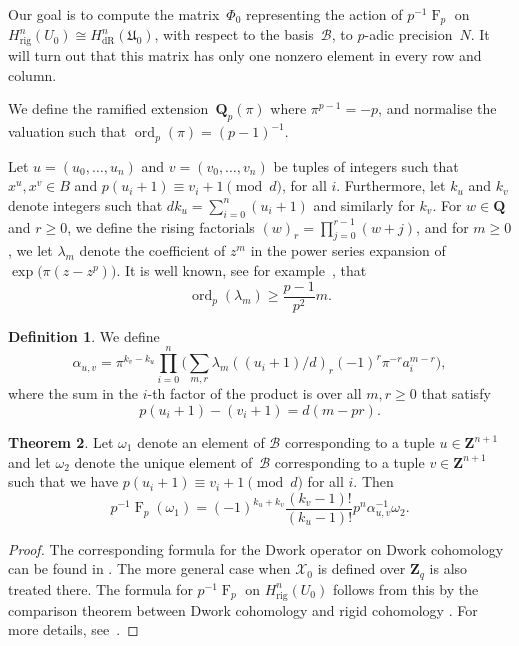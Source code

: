 \documentclass[a4paper,11pt]{article}
\numberwithin{equation}{section}
\newcommand{\ZZ}{\mathbf{Z}} %
\newcommand{\QQ}{\mathbf{Q}} %
\DeclareMathOperator{\ord}{ord}          %
\DeclareMathOperator{\Frob}{F}           %
\providecommand{\HdR}{H_{\text{dR}}}    %
\providecommand{\Hrig}{H_{\text{rig}}}  %
\providecommand{\cB}{\mathcal{B}} %
\theoremstyle{definition}
\newtheorem{thm}{Theorem}[section]
\newtheorem{defn}[thm]{Definition}
\begin{document}
Our goal is to compute 
the matrix~$\Phi_0$ representing the action of $p^{-1} \Frob_p$ on 
$\Hrig^n(U_0) \cong \HdR^n(\mathfrak{U}_0)$, with respect to the basis~$\cB$, 
to $p$-adic precision~$N$. It will turn out that this matrix has only one
nonzero element in every row and column.

We define the ramified extension~$\QQ_p(\pi)$ where $\pi^{p-1} = -p$, 
and normalise the valuation such that \mbox{$\ord_p(\pi) = (p-1)^{-1}$}.

Let $u = (u_0, \dotsc, u_n)$ and $v = (v_0, \dotsc, v_n)$ be tuples 
of integers such that $x^u, x^v \in B$ and $p (u_i+1) \equiv v_i+1 \pmod{d}$,
for all $i$. Furthermore, let $k_u$ and $k_v$ denote integers such that 
$d k_u = \sum_{i=0}^n (u_i + 1)$ and similarly for $k_v$. For $w \in \QQ$ 
and $r \geq 0$, we define the rising factorials $(w)_r = \prod_{j=0}^{r-1} (w + j)$, 
and for $m \geq 0$, we let $\lambda_m$ denote the coefficient of $z^m$ in the 
power series expansion of $\exp \bigl( \pi (z - z^p) \bigr)$. It is well known, see 
for example~\cite{Dwork1962}, that 
\begin{equation} \label{eqn:dworkbound}
\ord_p(\lambda_m) \geq \frac{p-1}{p^2} m. 
\end{equation}

\begin{defn} We define \label{defn:alpha}
\[
\alpha_{u,v} = \pi^{k_v - k_u} \prod_{i = 0}^n \biggl( \sum_{m, r} \lambda_m ((u_i + 1) / d)_r (-1)^r \pi^{-r} a_i^{m-r} \biggr),
\]
where the sum in the $i$-th factor of the product is over all $m, r \geq 0$  
that satisfy
\[
p(u_i+1)-(v_i+1)=d(m-pr).
\]
\end{defn}

\begin{thm} \label{thm:01-03-diagfrob}
Let $\omega_1$ denote an element of $\cB$ corresponding to a tuple 
$u \in \ZZ^{n+1}$ and let $\omega_2$ denote the unique element of~$\cB$ 
corresponding to a tuple $v \in \ZZ^{n+1}$ such that
we have $p (u_i + 1) \equiv v_i + 1 \pmod{d}$ for all $i$. Then
\begin{equation*}
p^{-1} \Frob_p (\omega_1) = 
    (-1)^{k_u + k_v} \frac{(k_v - 1)!}{(k_u - 1)!} p^n \alpha_{u,v}^{-1} \omega_2.
\end{equation*}
\end{thm}

\begin{proof}
The corresponding formula for the Dwork operator on Dwork cohomology can
be found in %
\citep[\S 6.1]{Lauder2004b}. The more general case when $\mathcal{X}_0$ 
is defined over $\ZZ_q$ is also treated there. The formula for 
$p^{-1} \Frob_p$ on $\Hrig^n(U_0)$ follows from this by the comparison theorem 
between Dwork cohomology and rigid cohomology \cite[Theorem 1.12]{Katz}. 
For more details, see~\cite[Theorem 4.4]{Gerkmann2007}.
\end{proof}
\end{document}
